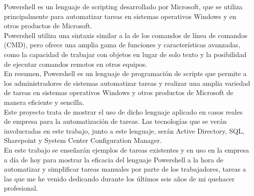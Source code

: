 \documentclass[a4paper, 12pt]{book}
\begin{document}
Powershell es un lenguaje de scripting desarrollado por Microsoft, que se utiliza principalmente para automatizar tareas en sistemas operativos Windows y en otros productos de Microsoft.
\\

Powershell utiliza una sintaxis similar a la de los comandos de línea de comandos (CMD), pero ofrece una amplia gama de funciones y características avanzadas, como la capacidad de trabajar con objetos en lugar de solo texto y la posibilidad de ejecutar comandos remotos en otros equipos.
\\

En resumen, Powershell es un lenguaje de programación de scripts que permite a los administradores de sistemas automatizar tareas y realizar una amplia variedad de tareas en sistemas operativos Windows y otros productos de Microsoft de manera eficiente y sencilla.
\\

Este proyecto trata de mostrar el uso de dicho lenguaje aplicado en casos reales de empresa para la automatización de tareas. Las tecnologías que se verán involucradas en este trabajo, junto a este lenguaje, serán Active Directory, SQL, Sharepoint y System Center Configuration Manager.
\\

En este trabajo se enseñarán ejemplos de tareas existentes y en uso en la empresa a día de hoy para mostrar la eficacia del lenguaje Powershell a la hora de automatizar y simplificar tareas manuales por parte de los trabajadores, tareas a las que me he venido dedicando durante los últimos seis años de mi quehacer profesional.




\end{document}
